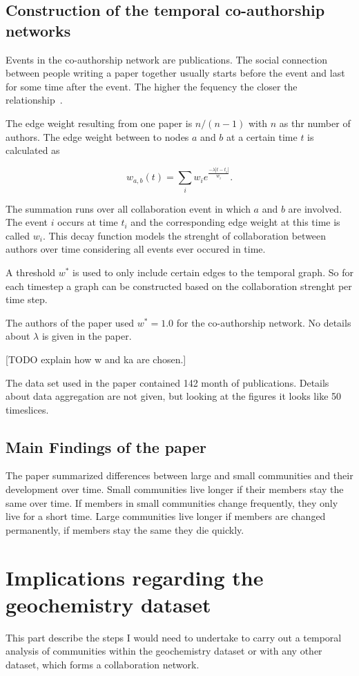 \documentclass[runningheads,a4paper]{llncs}
\begin{document}
\subsection{Construction of the temporal co-authorship networks}
\label{evolution-constr}
Events in the co-authorship network are publications.
The social connection between people writing a paper together usually starts before the event and last for some time after the event. The higher the fequency the closer the relationship~\cite{ramasco2006social}.

The edge weight resulting from one paper is $n/(n-1)$ with $n$ as thr number of authors. The edge weight between to nodes $a$ and $b$ at a certain time $t$ is calculated as

$$w_{a,b}(t)= \sum_{i}^{} w_i e^{\frac{-\lambda \left|t-t_i\right|}{w_i}}.$$

The summation runs over all collaboration event in which $a$ and $b$ are involved. The event $i$ occurs at time $t_i$ and the corresponding edge weight at this time is called $w_i$. This decay function models the strenght of collaboration between authors over time considering all events ever occured in time.

A threshold $w^*$ is used to only include certain edges to the temporal graph. So for each timestep a graph can be constructed based on the collaboration strenght per time step.

The authors of the paper used $w^*=1.0$ for the co-authorship network.
No details about $\lambda$ is given in the paper.

[TODO explain how w and ka are chosen.]

The data set used in the paper contained 142 month of publications. Details about data aggregation are not given, but looking at the figures it looks like 50 timeslices.

\subsection{Main Findings of the paper}
\label{evolution-findings}
The paper summarized differences between large and small communities and their development over time. Small communities live longer if their members stay the same over time. If members in small communities change frequently, they only live for a short time. Large communities live longer if members are changed permanently, if members stay the same they die quickly.

\section{Implications regarding the geochemistry dataset}
This part describe the steps I would need to undertake to carry out a temporal analysis of communities within the geochemistry dataset or with any other dataset, which forms a collaboration network.
\end{document}
